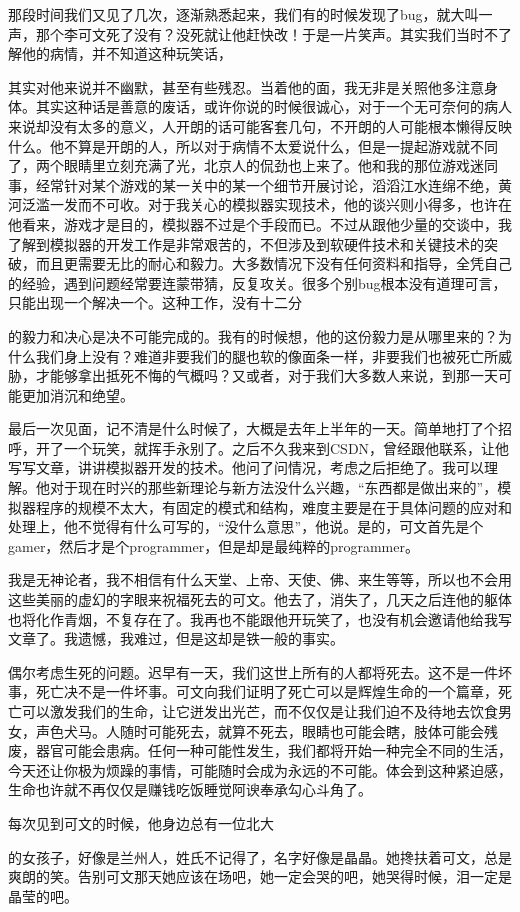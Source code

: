 \documentclass{article}
\begin{document}
那段时间我们又见了几次，逐渐熟悉起来，我们有的时候发现了bug，就大叫一声，那个李可文死了没有？没死就让他赶快改！于是一片笑声。其实我们当时不了解他的病情，并不知道这种玩笑话，

\newpage 

其实对他来说并不幽默，甚至有些残忍。当着他的面，我无非是关照他多注意身体。其实这种话是善意的废话，或许你说的时候很诚心，对于一个无可奈何的病人来说却没有太多的意义，人开朗的话可能客套几句，不开朗的人可能根本懒得反映什么。他不算是开朗的人，所以对于病情不太爱说什么，但是一提起游戏就不同了，两个眼睛里立刻充满了光，北京人的侃劲也上来了。他和我的那位游戏迷同事，经常针对某个游戏的某一关中的某一个细节开展讨论，滔滔江水连绵不绝，黄河泛滥一发而不可收。对于我关心的模拟器实现技术，他的谈兴则小得多，也许在他看来，游戏才是目的，模拟器不过是个手段而已。不过从跟他少量的交谈中，我了解到模拟器的开发工作是非常艰苦的，不但涉及到软硬件技术和关键技术的突破，而且更需要无比的耐心和毅力。大多数情况下没有任何资料和指导，全凭自己的经验，遇到问题经常要连蒙带猜，反复攻关。很多个别bug根本没有道理可言，只能出现一个解决一个。这种工作，没有十二分

\newpage 

的毅力和决心是决不可能完成的。我有的时候想，他的这份毅力是从哪里来的？为什么我们身上没有？难道非要我们的腿也软的像面条一样，非要我们也被死亡所威胁，才能够拿出抵死不悔的气概吗？又或者，对于我们大多数人来说，到那一天可能更加消沉和绝望。

最后一次见面，记不清是什么时候了，大概是去年上半年的一天。简单地打了个招呼，开了一个玩笑，就挥手永别了。之后不久我来到CSDN，曾经跟他联系，让他写写文章，讲讲模拟器开发的技术。他问了问情况，考虑之后拒绝了。我可以理解。他对于现在时兴的那些新理论与新方法没什么兴趣，“东西都是做出来的”，模拟器程序的规模不太大，有固定的模式和结构，难度主要是在于具体问题的应对和处理上，他不觉得有什么可写的，“没什么意思”，他说。是的，可文首先是个gamer，然后才是个programmer，但是却是最纯粹的programmer。

\newpage 



我是无神论者，我不相信有什么天堂、上帝、天使、佛、来生等等，所以也不会用这些美丽的虚幻的字眼来祝福死去的可文。他去了，消失了，几天之后连他的躯体也将化作青烟，不复存在了。我再也不能跟他开玩笑了，也没有机会邀请他给我写文章了。我遗憾，我难过，但是这却是铁一般的事实。

偶尔考虑生死的问题。迟早有一天，我们这世上所有的人都将死去。这不是一件坏事，死亡决不是一件坏事。可文向我们证明了死亡可以是辉煌生命的一个篇章，死亡可以激发我们的生命，让它迸发出光芒，而不仅仅是让我们迫不及待地去饮食男女，声色犬马。人随时可能死去，就算不死去，眼睛也可能会瞎，肢体可能会残废，器官可能会患病。任何一种可能性发生，我们都将开始一种完全不同的生活，今天还让你极为烦躁的事情，可能随时会成为永远的不可能。体会到这种紧迫感，生命也许就不再仅仅是赚钱吃饭睡觉阿谀奉承勾心斗角了。

每次见到可文的时候，他身边总有一位北大

\newpage 

的女孩子，好像是兰州人，姓氏不记得了，名字好像是晶晶。她搀扶着可文，总是爽朗的笑。告别可文那天她应该在场吧，她一定会哭的吧，她哭得时候，泪一定是晶莹的吧。
\end{document}
